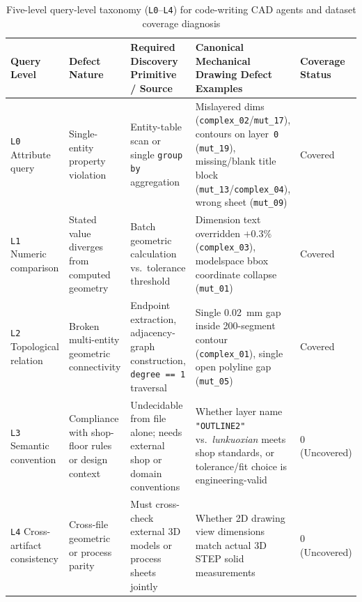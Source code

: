 \documentclass[nocopyright,nolists,upint,varvw,hyphenate]{asmejour}
\begin{document}
\begin{table}[t]
\caption{Five-level query-level taxonomy (\texttt{L0}--\texttt{L4}) for code-writing CAD agents and dataset coverage diagnosis}\label{tab:query_taxonomy}
\centering
\scriptsize
\setlength{\tabcolsep}{3pt}
%
\begin{tabularx}{\textwidth}{L{2.25cm} L{2.85cm} L{3.65cm} Y L{2.15cm}}
\toprule
Query Level & Defect Nature & Required Discovery Primitive / Source & Canonical Mechanical Drawing Defect Examples & Coverage Status \\
\midrule
\texttt{L0} Attribute query &
Single-entity property violation &
Entity-table scan or single \texttt{group by} aggregation &
Mislayered dims (\texttt{complex\_02}/\texttt{mut\_17}), contours on layer~\texttt{0} (\texttt{mut\_19}), missing/blank title block (\texttt{mut\_13}/\texttt{complex\_04}), wrong sheet (\texttt{mut\_09}) &
Covered \\
\addlinespace[2pt]
\texttt{L1} Numeric comparison &
Stated value diverges from computed geometry &
Batch geometric calculation vs.\ tolerance threshold &
Dimension text overridden $+0.3\%$ (\texttt{complex\_03}), modelspace bbox coordinate collapse (\texttt{mut\_01}) &
Covered \\
\addlinespace[2pt]
\texttt{L2} Topological relation &
Broken multi-entity geometric connectivity &
Endpoint extraction, adjacency-graph construction, \texttt{degree == 1} traversal &
Single 0.02~mm gap inside 200-segment contour (\texttt{complex\_01}), single open polyline gap (\texttt{mut\_05}) &
Covered \\
\addlinespace[2pt]
\texttt{L3} Semantic convention &
Compliance with shop-floor rules or design context &
Undecidable from file alone; needs external shop or domain conventions &
Whether layer name \texttt{"OUTLINE2"} vs.\ \emph{lunkuoxian} meets shop standards, or tolerance/fit choice is engineering-valid &
0 (Uncovered) \\
\addlinespace[2pt]
\texttt{L4} Cross-artifact consistency &
Cross-file geometric or process parity &
Must cross-check external 3D models or process sheets jointly &
Whether 2D drawing view dimensions match actual 3D STEP solid measurements &
0 (Uncovered) \\
\bottomrule
\end{tabularx}
\end{table}
\end{document}
